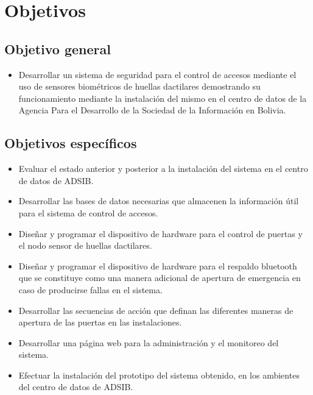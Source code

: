 \documentclass[../principal.tex]{subfiles}
\begin{document}
  \section{Objetivos}

  \subsection{Objetivo general}

  \begin{itemize}
    \setlength\itemsep{0.1em}

	  \item Desarrollar un sistema de seguridad para el control de accesos mediante el uso de sensores biométricos de huellas dactilares demostrando su funcionamiento mediante la instalación del mismo en el centro de datos de la Agencia Para el Desarrollo de la Sociedad de la Información en Bolivia.
  \end{itemize}

  \subsection{Objetivos específicos}

  \begin{itemize}
    \setlength\itemsep{0.5em}

    \item Evaluar el estado anterior y posterior a la instalación del sistema en el centro de datos de ADSIB.
	  \item Desarrollar las bases de datos necesarias que almacenen la información útil para el sistema de control de accesos.
	  \item Diseñar y programar el dispositivo de hardware para el control de puertas y el nodo sensor de huellas dactilares.
	  \item Diseñar y programar el dispositivo de hardware para el respaldo bluetooth que se constituye como una manera adicional de apertura de emergencia en caso de producirse fallas en el sistema.
	  \item Desarrollar las secuencias de acción que definan las diferentes maneras de apertura de las puertas en las instalaciones.
	  \item Desarrollar una página web para la administración y el monitoreo del sistema.
	  \item Efectuar la instalación del prototipo del sistema obtenido, en los ambientes del centro de datos de ADSIB.
  \end{itemize}
\end{document}
